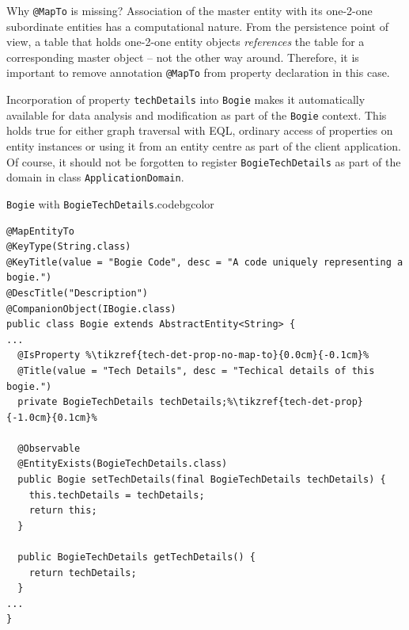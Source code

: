   \begin{notebox}{Why \texttt{@MapTo} is missing?}{\label{nb:mapto-missing-from-one-2-one-prop}}
    Association of the master entity with its one-2-one subordinate entities has a computational nature.
    From the persistence point of view, a table that holds one-2-one entity objects \emph{references} the table for a corresponding master object -- not the other way around.
    Therefore, it is important to remove annotation \texttt{@MapTo} from property declaration in this case.
  \end{notebox}
  
  Incorporation of property \texttt{techDetails} into \texttt{Bogie} makes it automatically available for data analysis and modification as part of the \texttt{Bogie} context.
  This holds true for either graph traversal with EQL, ordinary access of properties on entity instances or using it from an entity centre as part of the client application.
  Of course, it should not be forgotten to register \texttt{BogieTechDetails} as part of the domain in class \texttt{ApplicationDomain}.
  
  \begin{code}{\texttt{Bogie} with \texttt{BogieTechDetails}.}{\label{lst:ch02:00:Bogie-with-tech-details}}{codebgcolor}
  \begin{lstlisting}
@MapEntityTo
@KeyType(String.class)
@KeyTitle(value = "Bogie Code", desc = "A code uniquely representing a bogie.")
@DescTitle("Description")
@CompanionObject(IBogie.class)
public class Bogie extends AbstractEntity<String> { 
...
  @IsProperty %\tikzref{tech-det-prop-no-map-to}{0.0cm}{-0.1cm}%
  @Title(value = "Tech Details", desc = "Techical details of this bogie.")
  private BogieTechDetails techDetails;%\tikzref{tech-det-prop}{-1.0cm}{0.1cm}%

  @Observable
  @EntityExists(BogieTechDetails.class)
  public Bogie setTechDetails(final BogieTechDetails techDetails) {
    this.techDetails = techDetails;
    return this;
  }

  public BogieTechDetails getTechDetails() {
    return techDetails;
  }
...    
}    
  \end{lstlisting}
  \vspace*{-7px}
\end{code}      


